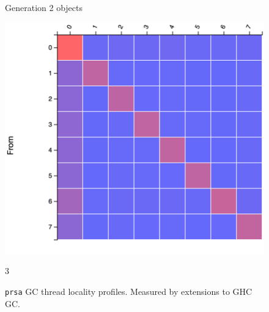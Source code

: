 \documentclass{paper}\usepackage{graphicx}
\begin{document}
\begin{figure}[!htb]
\begin{multicols}{3}
    \caption{Generation 2 objects}
    \label{fig:prsa_gen2}
    \includegraphics[width=\linewidth]{Paper/images/prsa/prsa_gen2.png}\par
    \end{multicols}{3}
    \caption{\lstinline{prsa} GC thread locality profiles. Measured by extensions to GHC GC.}
    \label{fig:prsa_static}
\end{figure}





\end{document}

